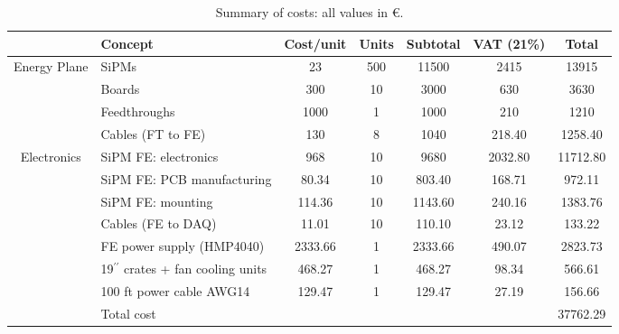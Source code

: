 \documentclass[a4paper,11pt,oneside]{article}
\begin{document}
\begin{table}[!h]
  \begin{center}
    \begin{tabular}{|c|l|cccc|c|}
      \hline
      & Concept & Cost/unit & Units & Subtotal & VAT
      (21\%) & Total\\
      \hline
      \multirow{4}{*}{Energy Plane} & SiPMs & 23 & 500 & 11500 & 2415 & 13915\\
      & Boards & 300 & 10 & 3000 & 630 & 3630\\
      & Feedthroughs & 1000 & 1 & 1000 & 210 & 1210\\
      & Cables (FT to FE) & 130 & 8 & 1040 & 218.40 & 1258.40\\
      \hline
      \multirow{7}{*}{Electronics} & SiPM FE: electronics & 968 & 10 &
      9680 & 2032.80 & 11712.80\\
      & SiPM FE: PCB manufacturing & 80.34 & 10 & 803.40 & 168.71 & 972.11\\
      & SiPM FE: mounting & 114.36 & 10 & 1143.60 & 240.16 & 1383.76\\
      & Cables (FE to DAQ) & 11.01 & 10 & 110.10 & 23.12 & 133.22\\
      & FE power supply (HMP4040) & 2333.66 & 1 & 2333.66 &
      490.07 & 2823.73\\
      & 19$^{\prime\prime}$ crates + fan cooling units & 468.27 & 1 & 468.27 & 98.34 & 566.61\\
      & 100 ft power cable AWG14 & 129.47 & 1 & 129.47 & 27.19 & 156.66\\
      \hline
      & Total cost & & & & & 37762.29\\
      \hline
    \end{tabular}
    \caption{Summary of costs: all values in \euro.}
    \label{tab:UpCost}
  \end{center}
\end{table}
\end{document}
